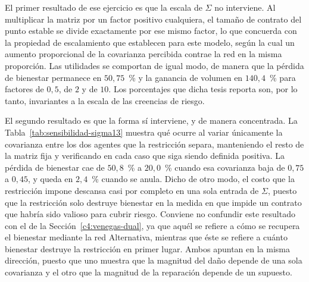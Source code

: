 El primer resultado de ese ejercicio es que la escala de $\Sigma$ no interviene. Al multiplicar la matriz por un factor positivo cualquiera, el tamaño de contrato del punto estable se divide exactamente por ese mismo factor, lo que concuerda con la propiedad de escalamiento que  establecen para este modelo, según la cual un aumento proporcional de la covarianza percibida contrae la red en la misma proporción. Las utilidades se comportan de igual modo, de manera que la pérdida de bienestar permanece en $50,75$~\% y la ganancia de volumen en $140,4$~\% para factores de $0,5$, de $2$ y de $10$. Los porcentajes que dicha tesis reporta son, por lo tanto, invariantes a la escala de las creencias de riesgo.

El segundo resultado es que la forma sí interviene, y de manera concentrada. La Tabla~\ref{tab:sensibilidad-sigma13} muestra qué ocurre al variar únicamente la covarianza entre los dos agentes que la restricción separa, manteniendo el resto de la matriz fija y verificando en cada caso que siga siendo definida positiva. La pérdida de bienestar cae de $50,8$~\% a $20,0$~\% cuando esa covarianza baja de $0,75$ a $0,45$, y queda en $2,4$~\% cuando se anula. Dicho de otro modo, el costo que la restricción impone descansa casi por completo en una sola entrada de $\Sigma$, puesto que la restricción solo destruye bienestar en la medida en que impide un contrato que habría sido valioso para cubrir riesgo. Conviene no confundir este resultado con el de la Sección~\ref{c4:venegas-dual}, ya que aquél se refiere a cómo se recupera el bienestar mediante la red Alternativa, mientras que éste se refiere a cuánto bienestar destruye la restricción en primer lugar. Ambos apuntan en la misma dirección, puesto que uno muestra que la magnitud del daño depende de una sola covarianza y el otro que la magnitud de la reparación depende de un supuesto.

